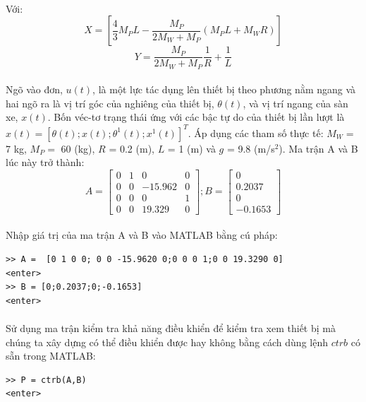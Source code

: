 \paragraph{}Với:
\begin{equation}
X = \left[\dfrac{4}{3}M_{P}L-\dfrac{M_{P}}{2M_{W}+M_{P}}(M_{P}L+M_{W}R)\right]
\end{equation}
\begin{equation}
Y = \dfrac{M_{P}}{2M_{W}+M_{P}}\dfrac{1}{R}+\dfrac{1}{L}
\end{equation}
\paragraph{}Ngõ vào đơn, $u(t)$, là một lực tác dụng lên thiết bị theo phương nằm ngang và hai ngõ ra là vị trí góc của nghiêng của thiết bị, $\theta(t)$, và vị trí ngang của sàn xe, $x(t)$. Bốn véc-tơ trạng thái ứng với các bậc tự do của thiết bị lần lượt là $x(t) = [\theta(t); x(t); \theta^{1}(t); x^{1}(t)]^{T}$. Áp dụng các tham số thực tế: $M_{W} =$ 7 kg, $M_{P} =$ 60 (kg), $R$ = 0.2 (m), $L$ = 1 (m) và $g$ = 9.8 (m/s$^{2}$). Ma trận A và B lúc này trở thành:
\begin{equation}
A = 
\begin{bmatrix}
0&1&0&0\\
0&0&-15.962&0\\
0&0&0&1\\
0&0&19.329&0
\end{bmatrix};
B = 
\begin{bmatrix}
0\\
0.2037\\
0\\
-0.1653
\end{bmatrix}
\end{equation}
\paragraph{}Nhập giá trị của ma trận A và B vào MATLAB bằng cú pháp:
\begin{lstlisting}
>> A =  [0 1 0 0; 0 0 -15.9620 0;0 0 0 1;0 0 19.3290 0]
<enter>
>> B = [0;0.2037;0;-0.1653] 
<enter>
\end{lstlisting}
\paragraph{}Sử dụng ma trận kiểm tra khả năng điều khiển để kiểm tra xem thiết bị mà chúng ta xây dựng có thể điều khiển được hay không bằng cách dùng lệnh $ctrb$ có sẵn trong MATLAB:
\begin{lstlisting}
>> P = ctrb(A,B) 
<enter>
\end{lstlisting}
